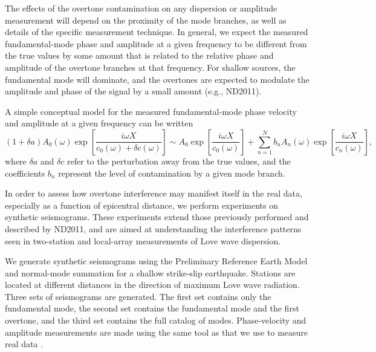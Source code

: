 \documentclass[12pt,oneside]{book}
\begin{document}
The effects of the overtone contamination on any dispersion or amplitude measurement will depend on the proximity of the mode branches, as well as details of the specific measurement technique. In general, we expect the measured fundamental-mode phase and amplitude at a given frequency to be different from the true values by some amount that is related to the relative phase and amplitude of the overtone branches at that frequency. For shallow sources, the fundamental mode will dominate, and the overtones are expected to modulate the amplitude and phase of the signal by a small amount (e.g., ND2011).

A simple conceptual model for the measured fundamental-mode phase velocity and amplitude at a given frequency can be written
\begin{equation}\label{eqot:2}
(1+\delta a) A_0(\omega) \exp \left[ \frac{i \omega X}{c_0(\omega) + 
\delta c(\omega)} \right] \sim A_0 \exp \left[ \frac{i \omega X}{c_0(\omega)}  \right] + \sum_{n=1}^{N} b_n A_{n}(\omega) \exp \left[ \frac{i \omega X}{c_{n}(\omega)} \right],
\end{equation}
where $\delta a$ and $\delta c$ refer to the perturbation away from the true values, and the coefficients $b_n$ represent the level of contamination by a given mode branch.

In order to assess how overtone interference may manifest itself in the real data, especially as a function of epicentral distance, we perform experiments on synthetic seismograms. These experiments extend those previously performed and described by ND2011, and are aimed at understanding the interference patterns seen in two-station and local-array measurements of Love wave dispersion.

We generate synthetic seismograms using the Preliminary Reference Earth Model \citep[PREM;][]{PREM} and normal-mode summation for a shallow strike-slip earthquake. Stations are located at different distances in the direction of maximum Love wave radiation.  Three sets of seismograms are generated. The first set contains only the fundamental mode, the second set contains the fundamental mode and the first overtone, and the third set contains the full catalog of modes. Phase-velocity and amplitude measurements are made using the same tool as that we use to measure real data \citep{Ekstrom1997}. 
\end{document}
